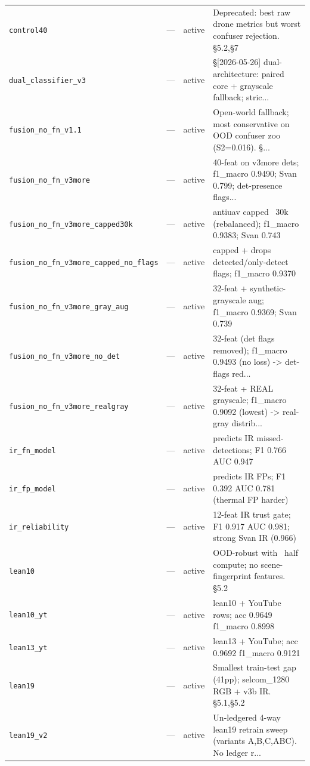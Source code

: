 \documentclass[12pt,a4paper,oneside,openright]{book}
\begin{document}
\begin{longtable}{p{}llp{}}
\texttt{control40} & --- & active & Deprecated: best raw drone metrics but worst confuser rejection. §5.2,§7 \\
\texttt{dual\_classifier\_v3} & --- & active & §[2026-05-26] dual-architecture: paired core + grayscale fallback; stric... \\
\texttt{fusion\_no\_fn\_v1.1} & --- & active & Open-world fallback; most conservative on OOD confuser zoo (S2=0.016). §... \\
\texttt{fusion\_no\_fn\_v3more} & --- & active & 40-feat on v3more dets; f1\_macro 0.9490; Svan 0.799; det-presence flags... \\
\texttt{fusion\_no\_fn\_v3more\_capped30k} & --- & active & antiuav capped ~30k (rebalanced); f1\_macro 0.9383; Svan 0.743 \\
\texttt{fusion\_no\_fn\_v3more\_capped\_no\_flags} & --- & active & capped + drops detected/only-detect flags; f1\_macro 0.9370 \\
\texttt{fusion\_no\_fn\_v3more\_gray\_aug} & --- & active & 32-feat + synthetic-grayscale aug; f1\_macro 0.9369; Svan 0.739 \\
\texttt{fusion\_no\_fn\_v3more\_no\_det} & --- & active & 32-feat (det flags removed); f1\_macro 0.9493 (no loss) -> det-flags red... \\
\texttt{fusion\_no\_fn\_v3more\_realgray} & --- & active & 32-feat + REAL grayscale; f1\_macro 0.9092 (lowest) -> real-gray distrib... \\
\texttt{ir\_fn\_model} & --- & active & predicts IR missed-detections; F1 0.766 AUC 0.947 \\
\texttt{ir\_fp\_model} & --- & active & predicts IR FPs; F1 0.392 AUC 0.781 (thermal FP harder) \\
\texttt{ir\_reliability} & --- & active & 12-feat IR trust gate; F1 0.917 AUC 0.981; strong Svan IR (0.966) \\
\texttt{lean10} & --- & active & OOD-robust with ~half compute; no scene-fingerprint features. §5.2 \\
\texttt{lean10\_yt} & --- & active & lean10 + YouTube rows; acc 0.9649 f1\_macro 0.8998 \\
\texttt{lean13\_yt} & --- & active & lean13 + YouTube; acc 0.9692 f1\_macro 0.9121 \\
\texttt{lean19} & --- & active & Smallest train-test gap (41pp); selcom\_1280 RGB + v3b IR. §5.1,§5.2 \\
\texttt{lean19\_v2} & --- & active & Un-ledgered 4-way lean19 retrain sweep (variants A,B,C,ABC). No ledger r... \\

\end{longtable}
\end{document}
